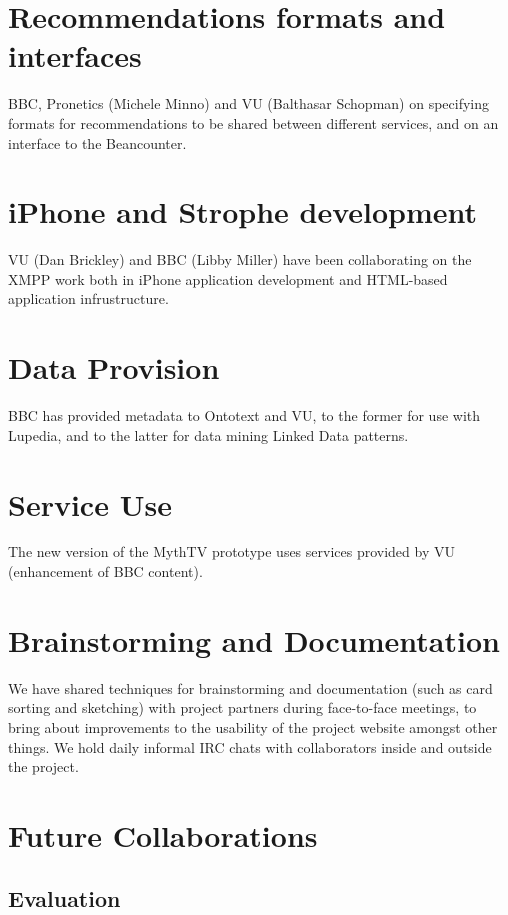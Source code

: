 \documentclass{notube}
\begin{document}
\section{Recommendations formats and interfaces}

BBC, Pronetics (Michele Minno) and VU (Balthasar Schopman) on specifying formats for recommendations to be shared between different services, and on an interface to the Beancounter.

\section{iPhone and Strophe development}

VU (Dan Brickley) and BBC (Libby Miller) have been collaborating on the XMPP work both in iPhone application development and HTML-based application infrustructure.

\section{Data Provision}

BBC has provided metadata to Ontotext and VU, to the former for use with Lupedia, and to the latter for data mining Linked Data patterns.

\section{Service Use}

The new version of the MythTV prototype uses services provided by VU (enhancement of BBC content).

\section{Brainstorming and Documentation}

We have shared techniques for brainstorming and documentation (such as card sorting and sketching) with project partners during face-to-face meetings, to bring about improvements to the usability of the project website amongst other things. We hold daily informal IRC chats with collaborators inside and outside the project.


\section{Future Collaborations}

\subsection{Evaluation}
\end{document}
